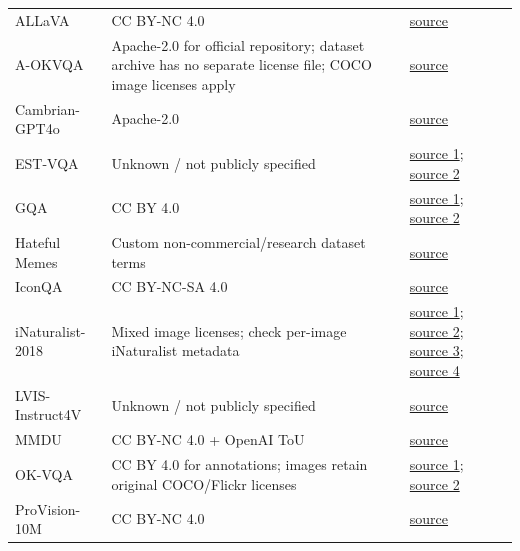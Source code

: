 \begin{longtable}{@{}>{\raggedright\arraybackslash}p{}>{\raggedright\arraybackslash}p{}>{\raggedright\arraybackslash}p{}@{}}
ALLaVA & CC BY-NC 4.0 & \href{https://huggingface.co/datasets/FreedomIntelligence/ALLaVA-4V}{source} \\
A-OKVQA & Apache-2.0 for official repository; dataset archive has no separate license file; COCO image licenses apply & \href{https://prior-datasets.s3.us-east-2.amazonaws.com/aokvqa/aokvqa_v1p0.tar.gz}{source} \\
Cambrian-GPT4o & Apache-2.0 & \href{https://huggingface.co/datasets/nyu-visionx/Cambrian-10M}{source} \\
EST-VQA & Unknown / not publicly specified & \href{https://drive.google.com/file/d/15q8Hqx3uQm8mx4w3PZtactJVe1BRXug5/view}{source 1}; \href{https://drive.google.com/file/d/1M3fWhFWltjM_nFR0ALynUIwXatwKXb26/view}{source 2} \\
GQA & CC BY 4.0 & \href{https://downloads.cs.stanford.edu/nlp/data/gqa/questions1.2.zip}{source 1}; \href{https://downloads.cs.stanford.edu/nlp/data/gqa/images.zip}{source 2} \\
Hateful Memes & Custom non-commercial/research dataset terms & \href{https://www.kaggle.com/datasets/parthplc/facebook-hateful-meme-dataset}{source} \\
IconQA & CC BY-NC-SA 4.0 & \href{https://iconqa2021.s3.us-west-1.amazonaws.com/iconqa_data.zip}{source} \\
iNaturalist-2018 & Mixed image licenses; check per-image iNaturalist metadata & \href{https://github.com/visipedia/inat_comp/blob/master/2018/README.md}{source 1}; \href{https://ml-inat-competition-datasets.s3.amazonaws.com/2018/train_val2018.tar.gz}{source 2}; \href{https://ml-inat-competition-datasets.s3.amazonaws.com/2018/train2018.json.tar.gz}{source 3}; \href{https://ml-inat-competition-datasets.s3.amazonaws.com/2018/categories.json.tar.gz}{source 4} \\
LVIS-Instruct4V & Unknown / not publicly specified & \href{https://huggingface.co/datasets/X2FD/LVIS-Instruct4V}{source} \\
MMDU & CC BY-NC 4.0 + OpenAI ToU & \href{https://huggingface.co/datasets/laolao77/MMDU}{source} \\
OK-VQA & CC BY 4.0 for annotations; images retain original COCO/Flickr licenses & \href{https://okvqa.allenai.org/static/data/mscoco_train2014_annotations.json.zip}{source 1}; \href{https://okvqa.allenai.org/static/data/OpenEnded_mscoco_train2014_questions.json.zip}{source 2} \\
ProVision-10M & CC BY-NC 4.0 & \href{https://huggingface.co/datasets/Salesforce/ProVision-10M}{source} \\

\end{longtable}
